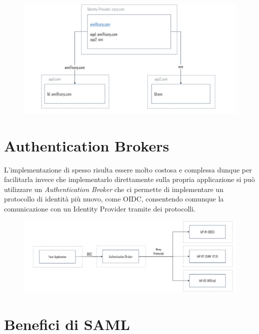 \begin{figure}[H]
      \centering
      \includegraphics[width=\textwidth, keepaspectratio]{capitoli/id_managing/imgs/federation.png}
\end{figure}

\section{Authentication Brokers}

L'implementazione di \saml{} spesso risulta essere molto costosa e complessa dunque
per facilitarla invece che implementarlo direttamente sulla propria applicazione
si può utilizzare un \textit{Authentication Broker} che ci permette
di implementare
un protocollo di identità più nuovo, come OIDC, consentendo comunque la
comunicazione con un Identity Provider tramite dei protocolli.

\begin{figure}[H]
      \centering
      \includegraphics[width=\textwidth, keepaspectratio]{capitoli/id_managing/imgs/broker.png}
\end{figure}

\section{Benefici di SAML}


